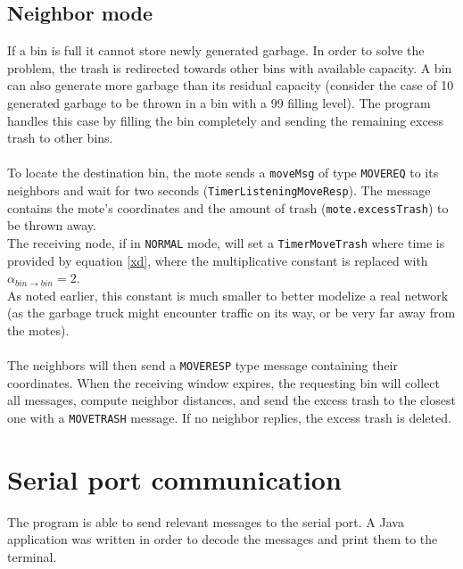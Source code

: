 \documentclass[a4paper,10pt]{article}
\begin{document}
\subsection{Neighbor mode}
If a bin is full it cannot store newly generated garbage. In order to solve the problem, the trash is redirected towards other bins with available capacity. A bin can also generate more garbage than its residual capacity (consider the case of 10 generated garbage to be thrown in a bin with a 99 filling level). The program handles this case by filling the bin completely and sending the remaining excess trash to other bins. \\ \\
To locate the destination bin, the mote sends a \texttt{moveMsg} of type \texttt{MOVEREQ} to its neighbors and wait for two seconds (\texttt{TimerListeningMoveResp}). The message contains the mote's coordinates and the amount of trash (\texttt{mote.excessTrash}) to be thrown away. \\The receiving node, if in \texttt{NORMAL} mode, will set a \texttt{TimerMoveTrash} where time is provided by equation \eqref{xd}, where the multiplicative constant is replaced with $\displaystyle \alpha_{bin\rightarrow bin} = 2$. \\As noted earlier, this constant is much smaller to better modelize a real network (as the garbage truck might encounter traffic on its way, or be very far away from the motes).\\\\
The neighbors will then send a \texttt{MOVERESP} type message containing their coordinates. When the receiving window expires, the requesting bin will collect all messages, compute neighbor distances, and send the excess trash to the closest one with a \texttt{MOVETRASH} message. If no neighbor replies, the excess trash is deleted.
\section{Serial port communication}
The program is able to send relevant messages to the serial port. A Java application was written in order to decode the messages and print them to the terminal.
\end{document}
